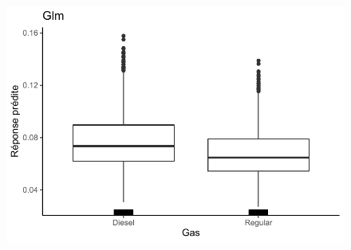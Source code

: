 \begin{figure}[b]
\begin{minipage}{0.45\linewidth}
\includegraphics[scale=0.6]{Graphiques/iceGasGlm}
\end{minipage}
\end{figure}

